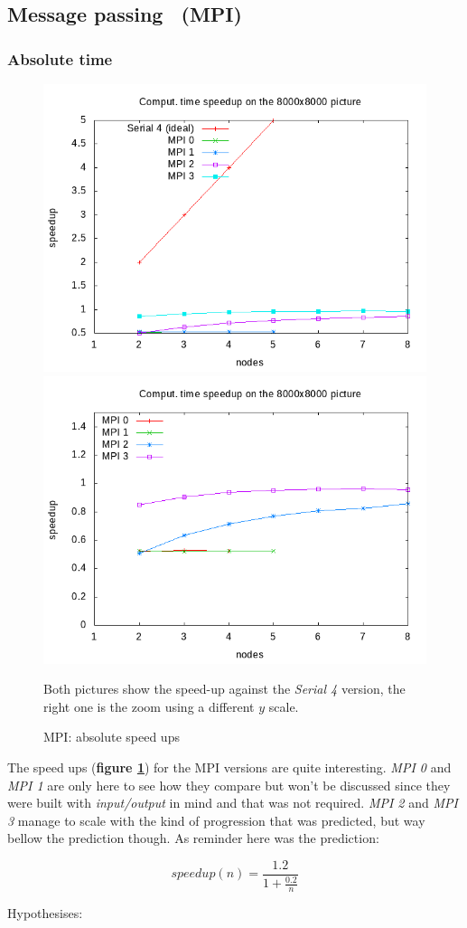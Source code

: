 \documentclass[10pt,a4paper]{article}
\begin{document}
\subsection{Message passing ~(MPI)}

\subsubsection{Absolute time}

\begin{figure}[ht]
\begin{center}
\includegraphics[width=.45\linewidth]{../../plots/mpi_speedup_compute_8000.png}
\includegraphics[width=.45\linewidth]{../../plots/mpi_speedup_compute_8000_no_ideal.png}
\end{center}
\caption{MPI: absolute speed ups}{Both pictures show the speed-up against the
\emph{Serial 4} version, the right one is the zoom using a different $y$ scale.}
\label{fig:mpis}
\end{figure}

The speed ups (\textbf{figure \ref{fig:mpis}}) for the MPI versions are quite
interesting. \emph{MPI 0} and \emph{MPI 1} are only here to see how they
compare but won't be discussed since they were built with \emph{input/output}
in mind and that was not required. \emph{MPI 2} and \emph{MPI 3} manage to
scale with the kind of progression that was predicted, but way bellow the
prediction though. As reminder here was the prediction:

$$speedup(n) = \frac{1.2}{1 + \frac{0.2}{n}}$$

Hypothesises:
\end{document}
